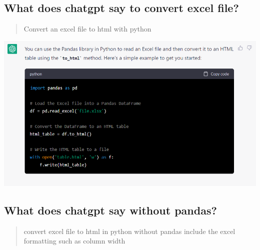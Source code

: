 \documentclass[
  letterpaper,
  DIV=11,
  numbers=noendperiod]{scrartcl}
\begin{document}
\hypertarget{what-does-chatgpt-say-to-convert-excel-file}{%
\subsection{What does chatgpt say to convert excel
file?}\label{what-does-chatgpt-say-to-convert-excel-file}}

\begin{quote}
Convert an excel file to html with python
\end{quote}

\includegraphics{ghtop_images/chatgpt_1.png}

\hypertarget{what-does-chatgpt-say-without-pandas}{%
\subsection{What does chatgpt say without
pandas?}\label{what-does-chatgpt-say-without-pandas}}

\begin{quote}
convert excel file to html in python without pandas include the excel
formatting such as column width
\end{quote}
\end{document}
